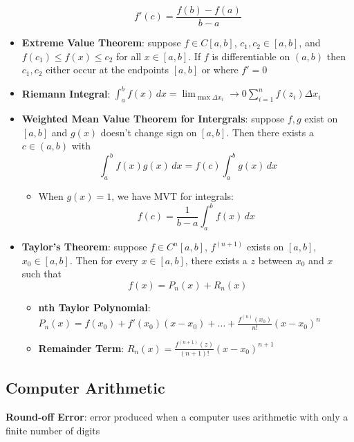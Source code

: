 \documentclass{article}
\begin{document}
\begin{itemize}
      \[f'(c) = \frac{f(b) - f(a)}{b - a}\]
    \item \textbf{Extreme Value Theorem}: suppose $f \in C[a,b]$, $c_1, c_2 \in [a,b]$, and $f(c_1) \leq f(x) \leq c_2$ for all $x \in [a,b]$. If $f$ is differentiable on $(a,b)$ then $c_1, c_2$ either occur at the endpoints $[a,b]$ or where $f' = 0$
    \item \textbf{Riemann Integral}: $\int_a^b f(x) \, dx = \lim_{\max{\Delta x_i}} \rightarrow 0 \sum_{i = 1}^n f(z_i) \Delta x_i$
    \item \textbf{Weighted Mean Value Theorem for Intergrals}: suppose $f, g$ exist on $[a,b]$ and $g(x)$ doesn't change sign on $[a,b]$. Then there exists a $c \in (a,b)$ with
      \[\int_a^b f(x) g(x) \, dx = f(c) \int_a^b g(x) \, dx\]
      \begin{itemize}
        \item When $g(x) = 1$, we have MVT for integrals:
          \[f(c) = \frac{1}{b-a} \int_a^b f(x) \, dx\]
      \end{itemize}
    \item \textbf{Taylor's Theorem}: suppose $f \in C^n[a,b]$, $f^{(n+1)}$ exists on $[a,b]$, $x_0 \in [a,b]$. Then for every $x \in [a,b]$, there exists a $z$ between $x_0$ and $x$ such that
      \[f(x) = P_n(x) + R_n(x)\]
      \begin{itemize}
        \item \textbf{nth Taylor Polynomial}: $P_n(x) = f(x_0) + f'(x_0)(x-x_0) + \ldots + \frac{f^{(n)}(x_0)}{n!}(x-x_0)^n$
        \item \textbf{Remainder Term}: $R_n(x) = \frac{f^{(n+1)}(z)}{(n+1)!}(x-x_0)^{n+1}$
      \end{itemize}
  \end{itemize}
  \subsection{Computer Arithmetic}
  \textbf{Round-off Error}: error produced when a computer uses arithmetic with only a finite number of digits
\end{document}

